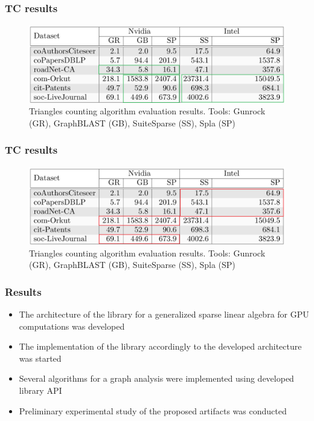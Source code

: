 \documentclass[aspectratio=169,xcolor=table,english]{beamer}
\begin{document}
\begin{frame}[fragile] \frametitle{TC results}
    \begin{center}
    \begin{minipage}[m]{0.9\linewidth}
        \begin{figure}
            \centering
            \includegraphics[width=1.0\textwidth]{figures/exp_tc_res_good.png}
            \caption{Triangles counting algorithm evaluation results. Tools: Gunrock (GR), GraphBLAST (GB), SuiteSparse (SS), Spla (SP)}
        \end{figure}
    \end{minipage}\hfill   
    \end{center}
\end{frame}

\begin{frame}[fragile] \frametitle{TC results}
    \begin{center}
    \begin{minipage}[m]{0.9\linewidth}
        \begin{figure}
            \centering
            \includegraphics[width=1.0\textwidth]{figures/exp_tc_res_bad.png}
            \caption{Triangles counting algorithm evaluation results. Tools: Gunrock (GR), GraphBLAST (GB), SuiteSparse (SS), Spla (SP)}
        \end{figure}
    \end{minipage}\hfill   
    \end{center}
\end{frame}

\begin{frame}[fragile] \frametitle{Results}
    \begin{itemize}
        \item The architecture of the library for a generalized sparse linear algebra for GPU computations was developed
        \item The implementation of the library accordingly to the developed architecture was started
        \item Several algorithms for a graph analysis were implemented using developed library API
        \item Preliminary experimental study of the proposed artifacts was conducted
    \end{itemize}
\end{frame}
\end{document}
